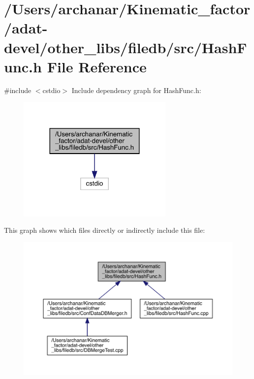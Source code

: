 \hypertarget{adat-devel_2other__libs_2filedb_2src_2HashFunc_8h}{}\section{/\+Users/archanar/\+Kinematic\+\_\+factor/adat-\/devel/other\+\_\+libs/filedb/src/\+Hash\+Func.h File Reference}
\label{adat-devel_2other__libs_2filedb_2src_2HashFunc_8h}
{\ttfamily \#include $<$cstdio$>$}\newline
Include dependency graph for Hash\+Func.\+h\+:
\nopagebreak
\begin{figure}[H]
\begin{center}
\leavevmode
\includegraphics[width=216pt]{db/db7/adat-devel_2other__libs_2filedb_2src_2HashFunc_8h__incl}
\end{center}
\end{figure}
This graph shows which files directly or indirectly include this file\+:
\nopagebreak
\begin{figure}[H]
\begin{center}
\leavevmode
\includegraphics[width=350pt]{dc/d8c/adat-devel_2other__libs_2filedb_2src_2HashFunc_8h__dep__incl}
\end{center}
\end{figure}
